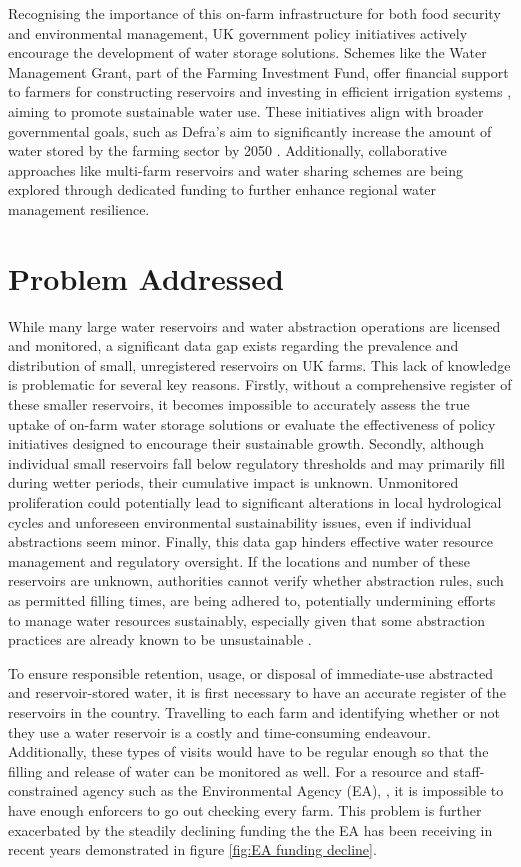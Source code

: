 Recognising the importance of this on-farm infrastructure for both food security and environmental management, UK government policy initiatives actively encourage the development of water storage solutions. Schemes like the Water Management Grant, part of the Farming Investment Fund, offer financial support to farmers for constructing reservoirs and investing in efficient irrigation systems \citep{ruralpaymentsagency_2023}, aiming to promote sustainable water use. These initiatives align with broader governmental goals, such as Defra's aim to significantly increase the amount of water stored by the farming sector by 2050 \citep{andcornwall_2024}. Additionally, collaborative approaches like multi-farm reservoirs and water sharing schemes \citep{for_2024} are being explored through dedicated funding to further enhance regional water management resilience.

\section{Problem Addressed}
While many large water reservoirs and water abstraction operations are licensed and monitored, a significant data gap exists regarding the prevalence and distribution of small, unregistered reservoirs on UK farms. This lack of knowledge is problematic for several key reasons. Firstly, without a comprehensive register of these smaller reservoirs, it becomes impossible to accurately assess the true uptake of on-farm water storage solutions or evaluate the effectiveness of policy initiatives designed to encourage their sustainable growth. Secondly, although individual small reservoirs fall below regulatory thresholds and may primarily fill during wetter periods, their cumulative impact is unknown. Unmonitored proliferation could potentially lead to significant alterations in local hydrological cycles and unforeseen environmental sustainability issues, even if individual abstractions seem minor. Finally, this data gap hinders effective water resource management and regulatory oversight. If the locations and number of these reservoirs are unknown, authorities cannot verify whether abstraction rules, such as permitted filling times, are being adhered to, potentially undermining efforts to manage water resources sustainably, especially given that some abstraction practices are already known to be unsustainable \citep{departmentofenvironmentfoodandruralaffairs_2019_abstraction}.

To ensure responsible retention, usage, or disposal of immediate-use abstracted and reservoir-stored water, it is first necessary to have an accurate register of the reservoirs in the country. Travelling to each farm and identifying whether or not they use a water reservoir is a costly and time-consuming endeavour. Additionally, these types of visits would have to be regular enough so that the filling and release of water can be monitored as well. For a resource and staff-constrained agency such as the Environmental Agency (EA), \citep{comptrollerandauditorgeneral_2022}, it is impossible to have enough enforcers to go out checking every farm. This problem is further exacerbated by the steadily declining funding the the EA has been receiving in recent years demonstrated in figure \ref{fig:EA funding decline}. 

